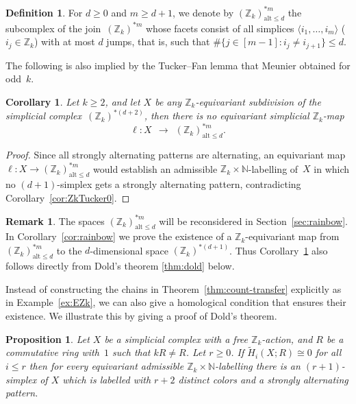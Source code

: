 \documentclass[11pt,a4paper,draft]{article}
\newcommand{\Z}{{\mathbb Z}}
\newcommand{\N}{{\mathbb N}}
\newcommand\isom{\cong}
\newcommand\simp[1]{\langle#1\rangle}
\newcommand\alt{{\mathrm{alt}}}
\newtheorem{corollary}[theorem]{Corollary}
\newtheorem{proposition}[theorem]{Proposition}
\theoremstyle{definition}
\newtheorem{definition}[theorem]{Definition}
\newtheorem{remark}[theorem]{Remark}
\begin{document}
\begin{definition}\label{def:Ealt}
For $d\ge0$ and $m\ge d+1$,
we denote by $(\Z_k)^{*m}_{\alt\le d}$
the subcomplex of the join~$(\Z_k)^{*m}$
whose facets consist of all simplices
$\simp{i_1,\dots,i_m}$ ($i_j\in\Z_k$) with at most
$d$ jumps, that is, such that
$\#\{j\in[m-1]:i_j\neq i_{j+1}\}\le d$.
\end{definition}

The following is also implied by the Tucker--Fan lemma that
Meunier \cite[Thm.~4]{meunier:_z_fan05} obtained for odd~$k$.

\begin{corollary}\label{cor:ZkTucker1}
  Let $k\ge2$, and let $X$ be any $\Z_k$-equivariant
  subdivision of the simplicial complex~$(\Z_k)^{*(d+2)}$,
  then there is no equivariant simplicial $\Z_k$-map
\[
\ell: X\ \ \longrightarrow\ \  (\Z_k)^{*m}_{\alt\le d}.
\]
\end{corollary}

\begin{proof}
Since all strongly alternating patterns are alternating, an equivariant map
$\ell\colon X\to(\Z_k)^{*m}_{\alt\le d}$ would establish an admissible
$\Z_k\times\N$-labelling of~$X$ in which no $(d+1)$-simplex gets a strongly
alternating
pattern, contradicting Corollary~\ref{cor:ZkTucker0}.
\end{proof}

\begin{remark}
The spaces  $(\Z_k)^{*m}_{\alt\le d}$ will be reconsidered in 
Section~\ref{sec:rainbow}.  In Corollary~\ref{cor:rainbow} we prove the
existence of a $\Z_k$-equi\-variant map from $(\Z_k)^{*m}_{\alt\le d}$
to the $d$-dimensional space $(\Z_k)^{*(d+1)}$.  Thus
Corollary~\ref{cor:ZkTucker1} also follows directly from Dold's theorem
\ref{thm:dold} below.
\end{remark}

Instead of constructing the chains in Theorem~\ref{thm:count-transfer}
explicitly as in Example~\ref{ex:EZk},
we can also give a homological condition that ensures
their existence.  We illustrate this by giving a proof of Dold's
theorem.

\begin{proposition}\label{prop:hom-bound}
Let $X$ be a simplicial complex with a free $\Z_k$-action,
and $R$ be a commutative ring with~$1$ such that $kR\ne R$. Let  $r\ge0$.
If $\widetilde H_i(X;R)\isom0$ for all $i\leq r$ then for every equivariant
admissible $\Z_k\times\N$-labelling there is an $(r+1)$-simplex of $X$
which is labelled with $r+2$ distinct colors and a strongly alternating pattern.
\end{proposition}
\end{document}
